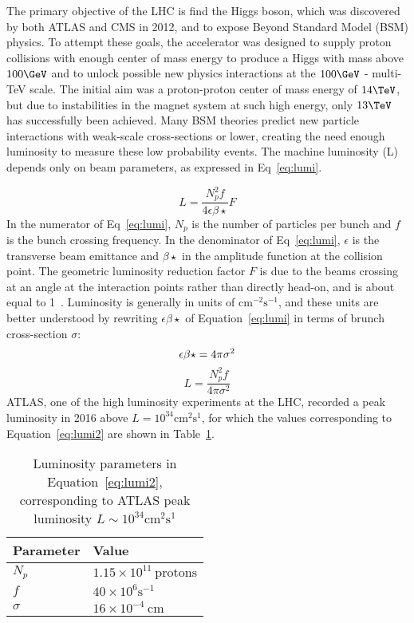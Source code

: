 The primary objective of the LHC is find the Higgs boson, which was discovered by both ATLAS and CMS in 2012, and to expose Beyond Standard Model (BSM) physics.  To attempt these goals, the accelerator was designed to supply proton collisions with enough center of mass energy to produce a Higgs with mass above $100\GeV$ and to unlock possible new physics interactions at the $100\GeV$ - multi-TeV scale.  The initial aim was a proton-proton center of mass energy of $14 \TeV$, but due to instabilities in the magnet system at such high energy, only $13\TeV$ has successfully been achieved.  Many BSM theories predict new particle interactions with weak-scale cross-sections or lower, creating the need enough luminosity to measure these low probability events.  The machine luminosity (L) depends only on beam parameters, as expressed in Eq~\ref{eq:lumi}.

\begin{equation}
L=\frac{N_p^2f}{4\epsilon\beta\star}F
\label{eq:lumi}
\end{equation}
In the numerator of Eq~\ref{eq:lumi}, $N_p$ is the number of particles per bunch and $f$ is the bunch crossing frequency.  In the denominator of Eq~\ref{eq:lumi}, $\epsilon$ is the transverse beam emittance and $\beta\star$ in the amplitude function at the collision point.  The geometric luminosity reduction factor $F$ is due to the beams crossing at an angle at the interaction points rather than directly head-on, and is about equal to 1~\cite{cid}.  Luminosity is generally in units of $\mathrm{cm}^{-2}\mathrm{s}^{-1}$, and these units are better understood by rewriting $\epsilon\beta\star$ of Equation~\ref{eq:lumi} in terms of brunch cross-section $\sigma$:
\begin{equation}
\epsilon\beta\star=4\pi\sigma^2\\
\label{eq:eb}
\end{equation} 
\begin{equation}
L=\frac{N_p^2f}{4\pi\sigma^2}
\label{eq:lumi2}
\end{equation} 
 ATLAS, one of the high luminosity experiments at the LHC, recorded a peak luminosity in 2016 above $L=10^{34}\mathrm{cm}^2\mathrm{s}^1$, for which the values corresponding to Equation~\ref{eq:lumi2} are shown in Table~\ref{tab:lumi}.
\begin{table}[!htb]
\centering
\small
\begin{tabular}{ll}
Parameter  & Value  \\
\hline \hline
$N_p$ & $1.15\times 10^{11}~\mathrm{protons}$ \\ 
$f$ & $40\times10^{6}\mathrm{s}^{-1}$ \\  
$\sigma$& $16\times10^{-4}~\mathrm{cm}$   \\
\hline 
\end{tabular}
\caption{Luminosity parameters in Equation~\ref{eq:lumi2}, corresponding to ATLAS peak luminosity $L\sim10^{34}\mathrm{cm}^2\mathrm{s}^1$}
\label{tab:lumi}
\end{table} 

